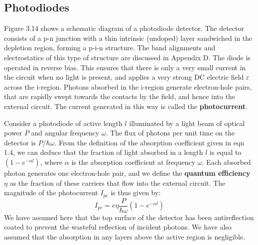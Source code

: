 \documentclass[12pt]{book}
\begin{document}
\subsection{Photodiodes}
Figure 3.14 shows a schematic diagram of a photodiode detector. The detector consists of a p-n junction with a thin intrinsic (undoped) layer sandwiched in the depletion region, forming a p-i-n structure. The band alignments and electrostatics of this type of structure are discussed in Appendix D. The diode is operated in reverse bias. This ensures that there is only a very small current in the circuit when no light is present, and applies a very strong DC electric field $\varepsilon$ across the i-region. Photons absorbed in the i-region generate electron-hole pairs, that are rapidly swept towards the contacts by the field, and hence into the external circuit. The current generated in this way is called the \textbf{photocurrent}.

Consider a photodiode of active length $l$ illuminated by a light beam of optical power $P$ and angular frequency $\omega$. The flux of photons per unit time on the detector is $P/\hbar\omega$. From the definition of the absorption coefficient given in eqn 1.4, we can deduce that the fraction of light absorbed in a length $l$ is equal to $(1-e^{-\alpha l})$, where $\alpha$ is the absorption coefficient at frequency $\omega$. Each absorbed photon generates one electron-hole pair, and we define the \textbf{quantum efficiency} $\eta$ as the fraction of these carriers that flow into the external circuit. The magnitude of the photocurrent $I_{pc}$ is thus given by:
\begin{equation}\label{equa:3.37}
  I_{pc}=e\eta\frac{P}{\hbar\omega}(1-e^{-\alpha l})
\end{equation}
We have assumed here that the top surface of the detector has been antireflection coated to prevent the wasteful reflection of incident photons. We have also assumed that the absorption in any layers above the active region is negligible.
\end{document}
